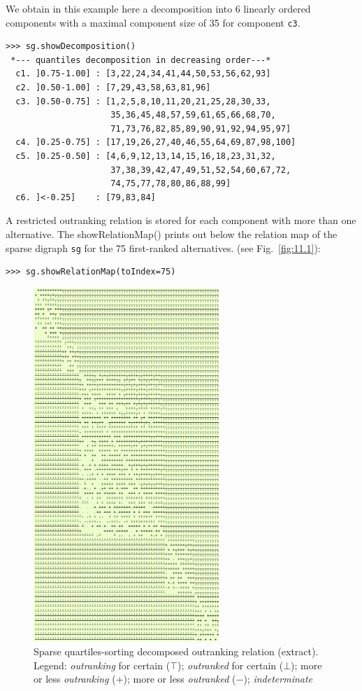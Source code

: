 We obtain in this example here a decomposition into 6 linearly ordered components with a maximal component size of 35 for component \texttt{c3}.

\begin{lstlisting}
>>> sg.showDecomposition()
 *--- quantiles decomposition in decreasing order---*
  c1. ]0.75-1.00] : [3,22,24,34,41,44,50,53,56,62,93]
  c2. ]0.50-1.00] : [7,29,43,58,63,81,96]
  c3. ]0.50-0.75] : [1,2,5,8,10,11,20,21,25,28,30,33,
                     35,36,45,48,57,59,61,65,66,68,70,
                     71,73,76,82,85,89,90,91,92,94,95,97]
  c4. ]0.25-0.75] : [17,19,26,27,40,46,55,64,69,87,98,100]
  c5. ]0.25-0.50] : [4,6,9,12,13,14,15,16,18,23,31,32,
                     37,38,39,42,47,49,51,52,54,60,67,72,
                     74,75,77,78,80,86,88,99]
  c6. ]<-0.25]    : [79,83,84]
\end{lstlisting}

A restricted outranking relation is stored for each component with more than one alternative. The showRelationMap() prints out below the relation map of the sparse digraph \texttt{sg} for the 75 first-ranked alternatives. (see Fig.~\vref{fig:11.1}):
\begin{lstlisting}
>>> sg.showRelationMap(toIndex=75)
\end{lstlisting}  
\begin{figure}[ht]
\sidecaption[t]
\includegraphics[width=7cm]{Figures/11-1-sparseRelationMap.png}
\caption[Sparse quartiles-sorting decomposed outranking relation]{Sparse quartiles-sorting decomposed outranking relation (extract). Legend: \emph{outranking} for certain ($\top$); \emph{outranked} for certain ($\bot$); more or less \emph{outranking} ($+$); more or less \emph{outranked} ($-$); \emph{indeterminate}}
\label{fig:11.1}       %
\end{figure}

